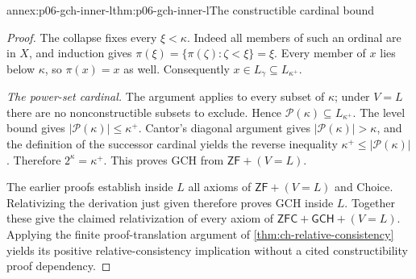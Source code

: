 \begin{annexitem}{annex:p06-gch-inner-l}{thm:p06-gch-inner-l}{The constructible cardinal bound}
\begin{proof}
The collapse fixes every \(\xi<\kappa\).
Indeed all members of such an ordinal are in \(X\),
and induction gives
\(\pi(\xi)=\{\pi(\zeta):\zeta<\xi\}=\xi\).
Every member of \(x\) lies below \(\kappa\), so
\(\pi(x)=x\) as well.
Consequently \(x\in L_\gamma\subseteq L_{\kappa^+}\).

\emph{The power-set cardinal.}
The argument applies to every subset of \(\kappa\);
under \(V=L\) there are no nonconstructible subsets to exclude.
Hence
\(\mathcal P(\kappa)\subseteq L_{\kappa^+}\).
The level bound gives
\(|\mathcal P(\kappa)|\leq\kappa^+\).
Cantor's diagonal argument gives
\(|\mathcal P(\kappa)|>\kappa\), and the definition of the
successor cardinal yields the reverse inequality
\(\kappa^+\leq|\mathcal P(\kappa)|\).
Therefore \(2^\kappa=\kappa^+\).
This proves GCH from \(\mathsf{ZF}+(V=L)\).

The earlier proofs establish inside \(L\) all axioms of
\(\mathsf{ZF}+(V=L)\) and Choice.
Relativizing the derivation just given therefore proves
GCH inside \(L\).
Together these give the claimed relativization of every
axiom of \(\mathsf{ZFC}+\mathsf{GCH}+(V=L)\).
Applying the finite proof-translation argument of
\cref{thm:ch-relative-consistency} yields its positive
relative-consistency implication without a cited
constructibility proof dependency.
\end{proof}
\end{annexitem}
